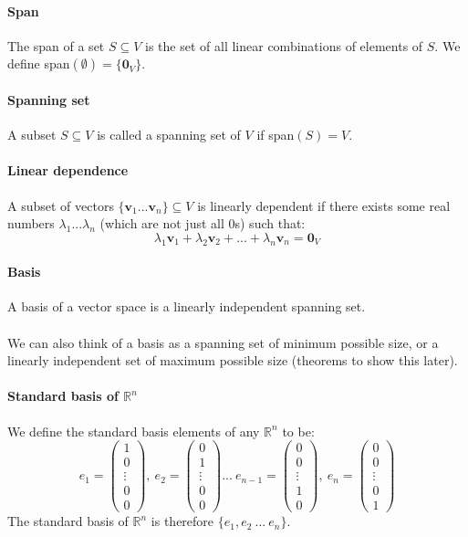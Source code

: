 \documentclass{article}
\newcommand{\R}{\mathbb{R}}
\renewcommand{\vec}[1]{\mathbf{#1}}
\begin{document}
\paragraph{Span}
The span of a set $ S \subseteq V $ is the set of all linear combinations of elements of $ S $. We define span$ (\emptyset) = \{\vec{0}_{V}\} $.
\paragraph{Spanning set}
A subset $ S \subseteq V $ is called a spanning set of $ V $ if span$ (S) = V $.
\paragraph{Linear dependence}
A subset of vectors $ \{ \vec{v}_{1}...\vec{v}_{n} \}  \subseteq V $ is linearly dependent if there exists some real numbers $ \lambda_{1}...\lambda_{n} $ (which are not just all $ 0 $s) such that:
\begin{equation}
\lambda_{1}\vec{v}_{1} + \lambda_{2}\vec{v}_{2} + ... + \lambda_{n}\vec{v}_{n} = \vec{0}_{V}
\end{equation}
\paragraph{Basis}
A basis of a vector space is a linearly independent spanning set.
\\\\
We can also think of a basis as a spanning set of minimum possible size, or a linearly independent set of maximum possible size (theorems to show this later).
\paragraph{Standard basis of $ \R^{n} $}
We define the standard basis elements of any $ \R^{n} $ to be:
\begin{equation}
e_{1} = 
\begin{pmatrix}
1 \\ 0 \\ \vdots \\ 0 \\ 0
\end{pmatrix} , \ 
e_{2} = 
\begin{pmatrix}
0 \\ 1 \\ \vdots \\ 0 \\ 0
\end{pmatrix} ... \
e_{n-1} = 
\begin{pmatrix}
0 \\ 0 \\ \vdots \\ 1 \\ 0
\end{pmatrix} , \
e_{n} = 
\begin{pmatrix}
0 \\ 0 \\ \vdots \\ 0 \\ 1
\end{pmatrix}
\end{equation}
The standard basis of $ \R^{n} $ is therefore $ \{e_{1}, e_{2} \ ... \ e_{n} \} $.
\end{document}
